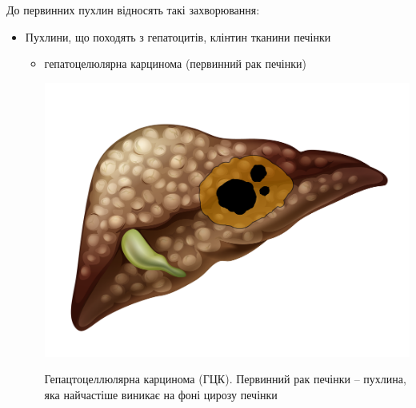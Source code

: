 До первинних пухлин відносять такі захворювання:

\begin{itemize}
    \item Пухлини, що походять з гепатоцитів, клінтин тканини печінки
        \begin{itemize}
            \item гепатоцелюлярна карцинома (первинний рак печінки)
            \begin{marginfigure}[-10pt]%
                \includegraphics[width=\linewidth]{Figures/HCC.png}
                \caption{Гепацтоцеллюлярна карцинома (ГЦК). Первинний рак печінки -- пухлина, яка найчастіше виникає на фоні цирозу печінки}
                 \label{fig:hcc}
            \end{marginfigure}
            

\end{itemize}
\end{itemize}
